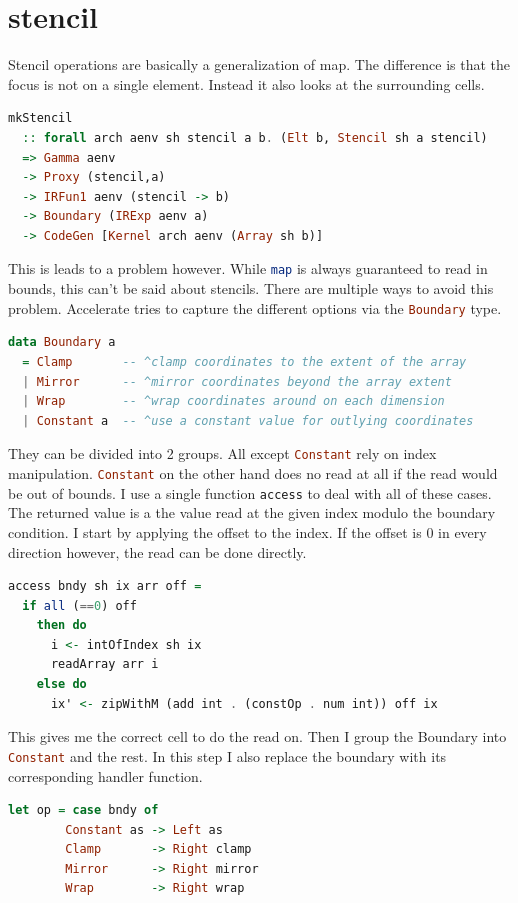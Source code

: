 \documentclass[a4paper,bibliography=totocnumbered,parskip,headsepline]{scrbook}
\begin{document}
\section{stencil}
Stencil operations are basically a generalization of map.
The difference is that the focus is not on a single element.
Instead it also looks at the surrounding cells.

\begin{lstlisting}[language=haskell]
mkStencil
  :: forall arch aenv sh stencil a b. (Elt b, Stencil sh a stencil)
  => Gamma aenv
  -> Proxy (stencil,a)
  -> IRFun1 aenv (stencil -> b)
  -> Boundary (IRExp aenv a)
  -> CodeGen [Kernel arch aenv (Array sh b)]
\end{lstlisting}

This is leads to a problem however.
While \lstinline[language=haskell]!map! is always guaranteed to read in bounds, this can't be said about stencils.
There are multiple ways to avoid this problem.
Accelerate tries to capture the different options via the \lstinline[language=haskell]!Boundary! type.
\begin{lstlisting}[language=haskell]
data Boundary a
  = Clamp       -- ^clamp coordinates to the extent of the array
  | Mirror      -- ^mirror coordinates beyond the array extent
  | Wrap        -- ^wrap coordinates around on each dimension
  | Constant a  -- ^use a constant value for outlying coordinates
\end{lstlisting}
They can be divided into 2 groups.
All except \lstinline[language=haskell]!Constant! rely on index manipulation.
\lstinline[language=haskell]!Constant! on the other hand does no read at all if the read would be out of bounds.
I use a single function \lstinline[language=haskell]!access! to deal with all of these cases.
The returned value is a the value read at the given index modulo the boundary condition.
I start by applying the offset to the index.
If the offset is 0 in every direction however, the read can be done directly.
\begin{lstlisting}[language=haskell]
access bndy sh ix arr off =
  if all (==0) off
    then do
      i <- intOfIndex sh ix
      readArray arr i
    else do
      ix' <- zipWithM (add int . (constOp . num int)) off ix
\end{lstlisting}
This gives me the correct cell to do the read on.
Then I group the Boundary into \lstinline[language=haskell]!Constant! and the rest.
In this step I also replace the boundary with its corresponding handler function.
\begin{lstlisting}[language=haskell]
  let op = case bndy of
        Constant as -> Left as
        Clamp       -> Right clamp
        Mirror      -> Right mirror
        Wrap        -> Right wrap
\end{lstlisting}
\end{document}
